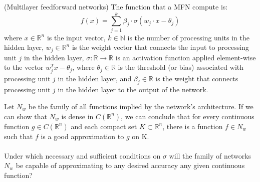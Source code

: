 \documentclass[../main.tex]{subfiles}
\begin{document}
	
	\begin{definition} (Multilayer feedforward networks) The function that a MFN compute is: 
		$$f(x)=\sum_{j=1}^k \beta_j \cdot \sigma(w_j \cdot x - \theta_j)$$
		where $x \in \mathbb{R}^n$ is the input vector, $k \in \mathbb{N}$ is the number of processing units in the hidden layer, $w_j \in \mathbb{R}^n$ is the weight vector that connects the input to processing unit $j$ in the hidden layer, $\sigma : \mathbb{R} \rightarrow \mathbb{R}$ is an activation function applied element-wise to the vector $w_j^T x - \theta_j$, where $\theta_j \in \mathbb{R}$ is the threshold (or bias) associated with processing unit $j$ in the hidden layer, and $\beta_j \in \mathbb{R}$ is the weight that connects processing unit $j$ in the hidden layer to the output of the network.
		
	\end{definition}
	\noindent Let $N_{w}$ be the family of all functions implied by the network's architecture.  If we can show that $N_{w}$ is dense in $C(\mathbb{R}^n)$, we can conclude that for every continuous function $g \in C(\mathbb{R}^n) $ and each compact set $K \subset \mathbb{R}^n$, there is a function $f \in N_{w}$ such that $f$ is a good approximation to $g$ on K. \\ \\
	\noindent Under which necessary and sufficient conditions on $\sigma$ will the family of networks $N_w$ be capable of approximating to any desired accuracy any given continuous function?
	
	
\end{document}
